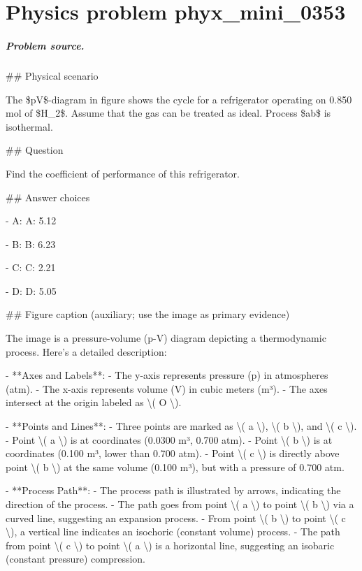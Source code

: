 
\chapter{Physics problem phyx\_mini\_0353}
\label{ch:PhyXMiniProblems_problem_phyx_mini_0353}

\paragraph{Problem source.}
\#\# Physical scenario

The \$pV\$-diagram in figure shows the cycle for a refrigerator operating on 0.850 mol of \$H\_2\$. Assume that the gas can be treated as ideal. Process \$ab\$ is isothermal.

\#\# Question

Find the coefficient of performance of this refrigerator.

\#\# Answer choices

- A: A: 5.12

- B: B: 6.23

- C: C: 2.21

- D: D: 5.05

\#\# Figure caption (auxiliary; use the image as primary evidence)

The image is a pressure-volume (p-V) diagram depicting a thermodynamic process. Here’s a detailed description:

- **Axes and Labels**: 
  - The y-axis represents pressure (p) in atmospheres (atm).
  - The x-axis represents volume (V) in cubic meters (m³).
  - The axes intersect at the origin labeled as \textbackslash{}( O \textbackslash{}).

- **Points and Lines**:
  - Three points are marked as \textbackslash{}( a \textbackslash{}), \textbackslash{}( b \textbackslash{}), and \textbackslash{}( c \textbackslash{}).
  - Point \textbackslash{}( a \textbackslash{}) is at coordinates (0.0300 m³, 0.700 atm).
  - Point \textbackslash{}( b \textbackslash{}) is at coordinates (0.100 m³, lower than 0.700 atm).
  - Point \textbackslash{}( c \textbackslash{}) is directly above point \textbackslash{}( b \textbackslash{}) at the same volume (0.100 m³), but with a pressure of 0.700 atm.

- **Process Path**:
  - The process path is illustrated by arrows, indicating the direction of the process.
  - The path goes from point \textbackslash{}( a \textbackslash{}) to point \textbackslash{}( b \textbackslash{}) via a curved line, suggesting an expansion process.
  - From point \textbackslash{}( b \textbackslash{}) to point \textbackslash{}( c \textbackslash{}), a vertical line indicates an isochoric (constant volume) process.
  - The path from point \textbackslash{}( c \textbackslash{}) to point \textbackslash{}( a \textbackslash{}) is a horizontal line, suggesting an isobaric (constant pressure) compression.

